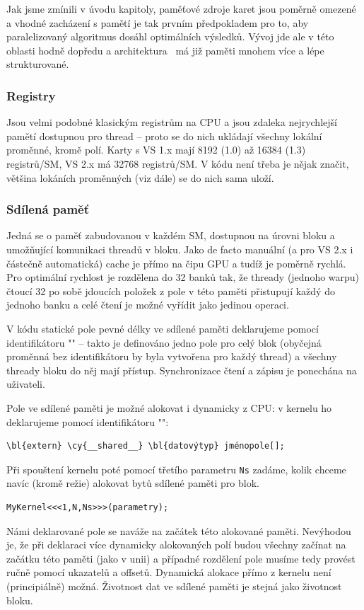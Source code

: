     Jak jsme zmínili v úvodu kapitoly, paměťové zdroje karet jsou poměrně omezené a vhodné zacházení s pamětí je tak prvním předpokladem pro to, aby paralelizovaný algoritmus dosáhl optimálních výsledků. Vývoj jde ale v této oblasti hodně dopředu a architektura \FERMI ~má již paměti mnohem více a lépe strukturované.

    \subsubsection{Registry}

    Jsou velmi podobné klasickým registrům na CPU a jsou zdaleka nejrychlejší pamětí dostupnou pro thread -- proto se do nich ukládají všechny lokální proměnné, kromě polí. Karty s VS 1.x mají 8192 (1.0) až 16384 (1.3) registrů/SM, VS 2.x má 32768 registrů/SM. V kódu není třeba je nějak značit, většina lokáních proměnných (viz dále) se do nich sama uloží.

    \subsubsection{Sdílená paměť}

    Jedná se o paměť zabudovanou v každém SM, dostupnou na úrovni bloku a umožňující komunikaci threadů v bloku. Jako de facto manuální (a pro VS 2.x i částečně automatická) cache je přímo na čipu GPU a tudíž je poměrně rychlá. Pro optimální rychlost je rozdělena do 32 banků tak, že thready (jednoho warpu) čtoucí 32 po sobě jdoucích položek z pole v této paměti přistupují každý do jednoho banku a celé čtení je možné vyřídit jako jedinou operaci.

    V kódu statické pole pevné délky ve sdílené paměti deklarujeme pomocí identifikátoru \Vr"" -- takto je definováno jedno pole pro celý blok (obyčejná proměnná bez identifikátoru by byla vytvořena pro každý thread) a všechny thready bloku do něj mají přístup. Synchronizace čtení a zápisu je ponechána na uživateli.

    Pole ve sdílené paměti je možné alokovat i dynamicky z CPU: v kernelu ho deklarujeme pomocí identifikátoru \Vr"":
    \begin{Verbatim}[commandchars = \\\{\}]
\bl{extern} \cy{__shared__} \bl{datovýtyp} jménopole[];
    \end{Verbatim}
    Při spouštení kernelu poté pomocí třetího parametru {\tt Ns} zadáme, kolik chceme navíc (kromě režie) alokovat bytů sdílené paměti pro blok.
    \begin{Verbatim}[commandchars = \\\{\}]
MyKernel<<<1,N,Ns>>>(parametry);
    \end{Verbatim}
    Námi deklarované pole se naváže na začátek této alokované paměti. Nevýhodou je, že při deklaraci více dynamicky alokovaných polí budou všechny začínat na začátku této paměti (jako v unii) a případné rozdělení pole musíme tedy provést ručně pomocí ukazatelů a offsetů. Dynamická alokace přímo z kernelu není (principiálně) možná. Životnost dat ve sdílené paměti je stejná jako životnost bloku.

